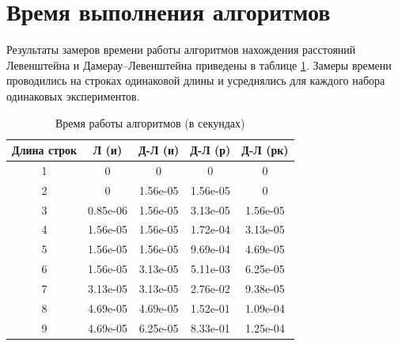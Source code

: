 \clearpage

\section{Время выполнения алгоритмов}

Результаты замеров времени работы алгоритмов нахождения расстояний
Левенштейна и Дамерау–Левенштейна приведены в таблице \ref{tbl:time_measurements}. Замеры времени проводились на строках одинаковой длины и усреднялись для каждого набора одинаковых экспериментов.

\begin{table}[h]
	\begin{center}
		\begin{threeparttable}
			\captionsetup{justification=raggedright,singlelinecheck=off}
			\caption{Время работы алгоритмов (в секундах)}
			\label{tbl:time_measurements}
			\begin{tabular}{|c|c|c|c|c|}
				\hline
				Длина строк &  Л (и)  & Д-Л (и) & Д-Л (р) & Д-Л (рк) \\
				\hline
				1    & 0 & 0 & 0 & 0 \\ 
				\hline
				2    & 0	 & 1.56e-05 & 1.56e-05 & 0 \\ 
				\hline
				3    & 0.85e-06 & 1.56e-05 & 3.13e-05 & 1.56e-05 \\ 
				\hline
				4    & 1.56e-05 & 1.56e-05 &  1.72e-04 & 3.13e-05 \\ 
				\hline
				5    & 1.56e-05 & 1.56e-05 &  9.69e-04 & 4.69e-05 \\ 
				\hline
				6    & 1.56e-05 & 3.13e-05 & 5.11e-03 & 6.25e-05 \\ 
				\hline
				7    & 3.13e-05 & 3.13e-05 & 2.76e-02 & 9.38e-05 \\ 
				\hline
				8    & 4.69e-05  & 4.69e-05 & 1.52e-01  & 1.09e-04 \\ 
				\hline
				9    & 4.69e-05  & 6.25e-05 & 8.33e-01 & 1.25e-04 \\
				\hline
			\end{tabular}
		\end{threeparttable}
	\end{center}
\end{table}

